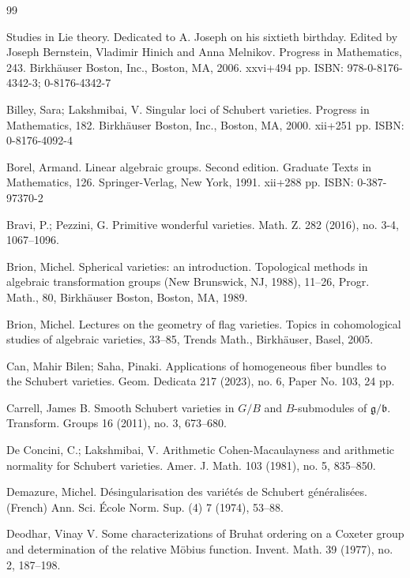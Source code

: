 \documentclass[12pt]{amsart}
\theoremstyle{definition}
\theoremstyle{remark}
\begin{document}
\begin{thebibliography}{99}

Studies in Lie theory. Dedicated to A. Joseph on his sixtieth birthday. Edited by Joseph Bernstein, Vladimir Hinich and Anna Melnikov. Progress in Mathematics, 243. Birkhäuser Boston, Inc., Boston, MA, 2006. xxvi+494 pp. ISBN: 978-0-8176-4342-3; 0-8176-4342-7

Billey, Sara; Lakshmibai, V. Singular loci of Schubert varieties. Progress in Mathematics, 182. Birkhäuser Boston, Inc., Boston, MA, 2000. xii+251 pp. ISBN: 0-8176-4092-4 

Borel, Armand. Linear algebraic groups. Second edition. Graduate Texts in Mathematics, 126. Springer-Verlag, New York, 1991. {\rm xii}+288 pp. ISBN: 0-387-97370-2

Bravi, P.; Pezzini, G. Primitive wonderful varieties. Math. Z. 282 (2016), no. 3-4, 1067--1096.

Brion, Michel. Spherical varieties: an introduction. Topological methods in algebraic transformation groups (New Brunswick, NJ, 1988), 11--26, Progr. Math., 80, Birkhäuser Boston, Boston, MA, 1989.

Brion, Michel. Lectures on the geometry of flag varieties. Topics in cohomological studies of algebraic varieties, 33--85, Trends Math., Birkhäuser, Basel, 2005.

Can, Mahir Bilen; Saha, Pinaki. Applications of homogeneous fiber bundles to the Schubert varieties. Geom. Dedicata 217 (2023), no. 6, Paper No. 103, 24 pp.

Carrell, James B. Smooth Schubert varieties in $G/B$ and $B$-submodules of $\mathfrak{g} /\mathfrak{b}$. Transform. Groups 16 (2011), no. 3, 673--680.

De Concini, C.; Lakshmibai, V. Arithmetic Cohen-Macaulayness and arithmetic normality for Schubert varieties. Amer. J. Math. 103 (1981), no. 5, 835--850.

Demazure, Michel. Désingularisation des variétés de Schubert généralisées. (French) Ann. Sci. École Norm. Sup. (4) 7 (1974), 53--88.

Deodhar, Vinay V. Some characterizations of Bruhat ordering on a Coxeter group and determination of the relative Möbius function. Invent. Math. 39 (1977), no. 2, 187--198.


\end{thebibliography}
\end{document}
